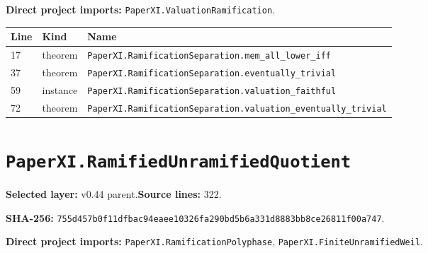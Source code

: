 \documentclass[10pt,oneside]{book}
\begin{document}

\textbf{Direct project imports:} \nolinkurl{PaperXI.ValuationRamification}.

\begin{longtable}{@{}p{}p{}p{}@{}}\toprule Line&Kind&Name\\\midrule\endhead

17&theorem&\nolinkurl{PaperXI.RamificationSeparation.mem_all_lower_iff}\\

37&theorem&\nolinkurl{PaperXI.RamificationSeparation.eventually_trivial}\\

59&instance&\nolinkurl{PaperXI.RamificationSeparation.valuation_faithful}\\

72&theorem&\nolinkurl{PaperXI.RamificationSeparation.valuation_eventually_trivial}\\

\bottomrule\end{longtable}

\section{\texorpdfstring{\nolinkurl{PaperXI.RamifiedUnramifiedQuotient}}{PaperXI.RamifiedUnramifiedQuotient}}\label{module:PaperXI.RamifiedUnramifiedQuotient}

\textbf{Selected layer:} v0.44 parent.\quad\textbf{Source lines:} 322.\par\textbf{SHA-256:} {\scriptsize\nolinkurl{755d457b0f11dfbac94eaee10326fa290bd5b6a331d8883bb8ce26811f00a747}}.


\textbf{Direct project imports:} \nolinkurl{PaperXI.RamificationPolyphase}, \nolinkurl{PaperXI.FiniteUnramifiedWeil}.
\end{document}
